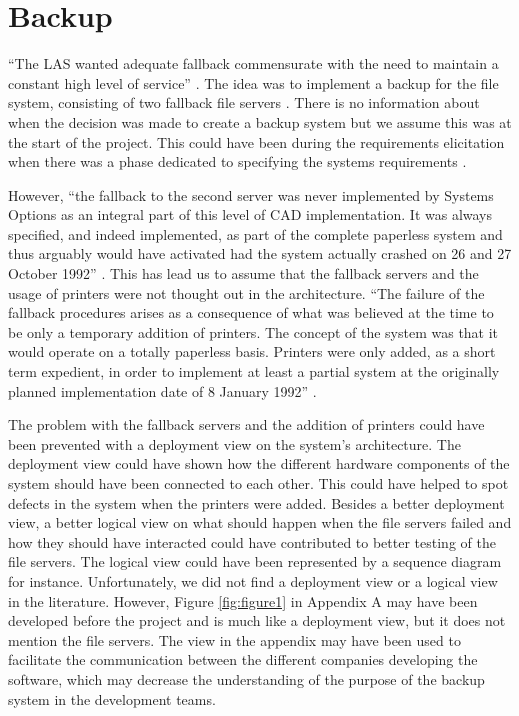 \section*{Backup}

``The LAS wanted adequate fallback commensurate with the need to maintain a constant high level of service'' \autocite[5038]{officialreport}.
The idea was to implement a backup for the file system, consisting of two fallback file servers \autocite[3132]{officialreport}.
There is no information about when the decision was made to create a backup system but we assume this was at the start of the project.
This could have been during the requirements elicitation when there was a phase dedicated to specifying the systems requirements \autocite[2018a]{officialreport}.

However, ``the fallback to the second server was never implemented by Systems Options as an integral part of this level of CAD implementation.
It was always specified, and indeed implemented, as part of the complete paperless system and thus arguably would have activated had the system actually crashed on 26 and 27 October 1992'' \autocite[4041]{officialreport}.
This has lead us to assume that the fallback servers and the usage of printers were not thought out in the architecture.
``The failure of the fallback procedures arises as a consequence of what was believed at the time to be only a temporary addition of printers.
The concept of the system was that it would operate on a totally paperless basis.
Printers were only added, as a short term expedient, in order to implement at least a partial system at the originally planned implementation date of 8 January 1992'' \autocite[4040]{officialreport}.

The problem with the fallback servers and the addition of printers could have been prevented with a deployment view on the system's architecture.
The deployment view could have shown how the different hardware components of the system should have been connected to each other.
This could have helped to spot defects in the system when the printers were added.
Besides a better deployment view, a better logical view on what should happen when the file servers failed and how they should have interacted could have contributed to better testing of the file servers.
The logical view could have been represented by a sequence diagram for instance.
Unfortunately, we did not find a deployment view or a logical view in the literature.
However, Figure \ref{fig:figure1} in Appendix A may have been developed before the project and is much like a deployment view, but it does not mention the file servers.
The view in the appendix may have been used to facilitate the communication between the different companies developing the software,
which may decrease the understanding of the purpose of the backup system in the development teams.

